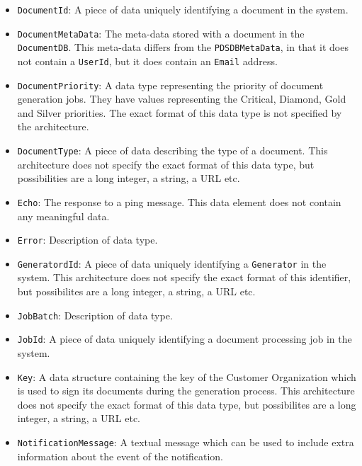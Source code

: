 \documentclass[a4paper,10pt]{article}
\begin{document}
\begin{itemize}
	\item \texttt{DocumentId}: A piece of data uniquely identifying a document in the system.

	\item \texttt{DocumentMetaData}: The meta-data stored with a document in the \texttt{DocumentDB}. This meta-data differs from the \texttt{PDSDBMetaData}, in that it does not contain a \texttt{UserId}, but it does contain an \texttt{Email} address.
	
	\item \texttt{DocumentPriority}: A data type representing the priority of document generation jobs. They have values representing the Critical, Diamond, Gold and Silver priorities. The exact format of this data type is not specified by the architecture.
	
	\item \texttt{DocumentType}: A piece of data describing the type of a document. This architecture does not specify the exact format of this data type, but possibilities are a long integer, a string, a URL etc.
	
	\item \texttt{Echo}: The response to a ping message. This data element does not contain any meaningful data.
	
	\item \texttt{Error}: Description of data type.
	
    \item \texttt{GeneratordId}: A piece of data uniquely identifying a \texttt{Generator} in the system. This architecture does not specify the exact format of this identifier, but possibilites are a long integer, a string, a URL etc.
    
    \item \texttt{JobBatch}: Description of data type.
    
    \item \texttt{JobId}: A piece of data uniquely identifying a document processing job in the system.
    
    \item \texttt{Key}: A data structure containing the key of the Customer Organization which is used to sign its documents during the generation process. This architecture does not specify the exact format of this data type, but possibilites are a long integer, a string, a URL etc.
    
    \item \texttt{NotificationMessage}: A textual message which can be used to include extra information about the event of the notification.
    

\end{itemize}
\end{document}

